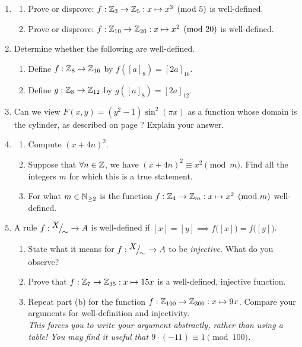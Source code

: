 \begin{exercises}{}{}
\begin{enumerate}
	\item\begin{enumerate}
	  	\item Prove or disprove: $f:\mathbb{Z}_3\to\mathbb{Z}_5:x\mapsto x^3\pmod 5$ is well-defined.
			\item Prove or disprove: $f:\mathbb{Z}_{10}\to\mathbb{Z}_{20}:x\mapsto x^2\pmod{20}$ is well-defined.
		\end{enumerate}
		
		
				
	\item Determine whether the following are well-defined.
        \begin{enumerate}
            \item Define $f : \mathbb{Z}_8 \to \mathbb{Z}_{16}$ by $f([a]_8) = [2a]_{16}$.
            \item Define $g : \mathbb{Z}_8 \to \mathbb{Z}_{12}$ by $g([a]_8) = [2a]_{12}$.
        \end{enumerate}
		
	\item Can we view $F(x,y)=(y^2-1)\sin^2(\pi x)$ as a function whose domain is the cylinder, as described on page \pageref{subsec:cylinder}? Explain your answer. 

	\item\begin{enumerate}
	  	\item Compute $(x+4n)^2$.
	  	\item Suppose that $\forall n\in\mathbb{Z}$, we have $(x+4n)^2\equiv x^2\pmod m$. Find all the integers $m$ for which this is a true statement.
	  	\item For what $m\in\mathbb{N}_{\ge 2}$ is the function $f:\mathbb{Z}_4\to\mathbb{Z}_m:x\mapsto x^2\pmod m$ well-defined.
		\end{enumerate}
		
	\item A rule $f:{}^{\textstyle {X}}\!\big/_{\textstyle \!{\sim}}\to A$ is well-defined if $[x]=[y]\implies f\bigl([x]\bigr)=f\bigl([y]\bigr)$.
	\begin{enumerate}
	  \item State what it means for $f:{}^{\textstyle {X}}\!\big/_{\textstyle \!{\sim}}\to A$ to be \emph{injective.} What do you observe?
	  \item Prove that $f:\mathbb{Z}_7\to\mathbb{Z}_{35}:x\mapsto 15x$ is a well-defined, injective function.
	  \item Repeat part (b) for the function $f:\mathbb{Z}_{100}\to\mathbb{Z}_{300}:x\mapsto 9x$. Compare your arguments for well-definition and injectivity.\\
	  \emph{This forces you to write your argument abstractly, rather than using a table! You may find it useful that $9\cdot(-11)\equiv 1\pmod{100}$.}
	\end{enumerate}


\end{enumerate}
\end{exercises}
